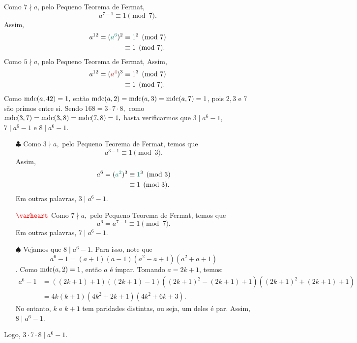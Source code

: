 \documentclass[12pt, a4paper]{article}
\newcommand{\mdc}{{\rm mdc}}
\newcommand{\negrito}[1]{\mbox{\boldmath{$#1$}}}
\newcommand{\alt}[1]{\textcolor{Floresta}{$\negrito{(#1)} $}}
\begin{document}
\begin{solution}
{    Como $7\nmid a$, pelo Pequeno Teorema de Fermat, 
    $$a^{7-1}\equiv 1\pmod7.$$
    Assim,
    \begin{align*}a^{12}=(\textcolor{PineGreen}{a^6})^2&\equiv \textcolor{PineGreen}{1}^2 \pmod 7 
    \\&\equiv 1 \pmod 7.\end{align*}
    Como $5\nmid a$, pelo Pequeno Teorema de Fermat, 
    Assim,
    \begin{align*}a^{12}=(\textcolor{Mahogany}{a^4})^3&\equiv \textcolor{Mahogany}{1}^3 \pmod 7 
    \\&\equiv 1 \pmod 7.\end{align*}
    	\task[\alt{c}] Como $\mdc(a,42)=1,$ então $\mdc(a,2)=\mdc(a,3)=\mdc(a,7)=1$, pois $2,3$ e $7$ são primos entre si. Sendo $168 = 3 \cdot 7 \cdot 8,$ como $\mdc(3,7) = \mdc(3,8) = \mdc(7,8) = 1,$ basta verificarmos que $3 \mid a^6 - 1$, $7 \mid a^6 - 1$ e $8 \mid a^6 - 1.$ 
    	\begin{itemize}
    	    \item[$\clubsuit$] Como $3 \nmid a,$ pelo Pequeno Teorema de Fermat, temos que
    	    \[
    	    a^{3-1} \equiv 1 \pmod 3.
    	    \]
    	    Assim,
    \begin{align*}a^{6}=(\textcolor{PineGreen}{a^2})^3&\equiv \textcolor{PineGreen}{1}^3 \pmod 3 
    \\&\equiv 1 \pmod 3.\end{align*}
    Em outras palavras, $3 \mid a^6 - 1.$
    	    \item[$\textcolor{red}{\varheart}$] Como $7 \nmid a,$ pelo Pequeno Teorema de Fermat, temos que
    	    \[
    	    a^6 = a^{7-1} \equiv 1 \pmod 7.
    	    \]
    Em outras palavras, $7 \mid a^6 - 1.$
    	    \item[$\spadesuit$] 
    Vejamos que $8\mid a^6-1$. Para isso, note que $$a^6-1=(a+1)(a-1)(a^2-a+1)(a^2+a+1)$$. Como $\mdc(a,2)=1$, então $a$ é ímpar. Tomando $a=2k+1$, temos:
    \begin{align*}a^6-1&= ((2k+1)+1)((2k+1)-1)((2k+1)^2-(2k+1)+1)((2k+1)^2 + (2k+1)+1)\\
    &=4k(k+1)(4k^2+2k+1)(4k^2+6k+3).\end{align*}
    No entanto, $k$ e $k+1$ tem paridades distintas, ou seja, um deles é par. Assim, $8\mid a^6-1$.
    	\end{itemize}
    Logo, $3\cdot7\cdot8\mid a^6-1.$
	}
\end{solution}
\end{document}
